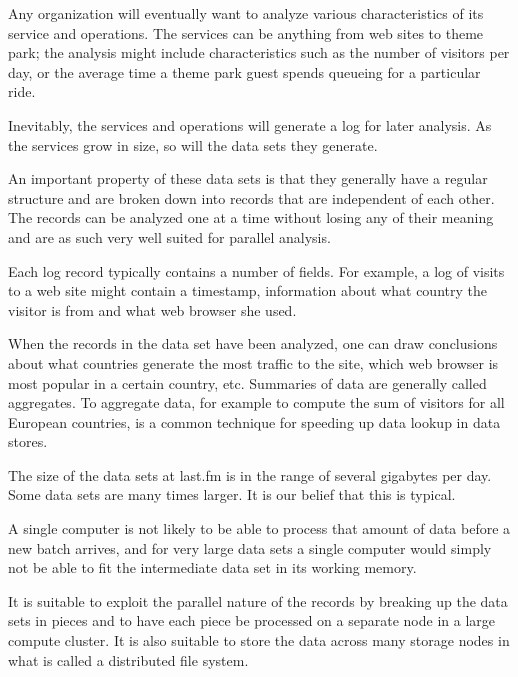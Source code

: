
Any organization will eventually want to analyze various characteristics of
its service and operations. The services can be anything from web sites to
theme park; the analysis might include characteristics such as the number of
visitors per day, or the average time a theme park guest spends queueing for a
particular ride.

Inevitably, the services and operations will generate a log for later
analysis. As the services grow in size, so will the data sets they generate.

An important property of these data sets is that they generally have a regular
structure and are broken down into records that are independent of each other.
The records can be analyzed one at a time without losing any of their meaning
and are as such very well suited for parallel analysis.

Each log record typically contains a number of fields. For example, a log of
visits to a web site might contain a timestamp, information about what country
the visitor is from and what web browser she used.

When the records in the data set have been analyzed, one can draw conclusions
about what countries generate the most traffic to the site, which web browser
is most popular in a certain country, etc. Summaries of data are generally
called aggregates. To aggregate data, for example to compute the sum of
visitors for all European countries, is a common technique for speeding up
data lookup in data stores.

The size of the data sets at last.fm is in the range of several gigabytes per
day. Some data sets are many times larger. It is our belief that this is
typical.

A single computer is not likely to be able to process that amount of data
before a new batch arrives, and for very large data sets a single computer
would simply not be able to fit the intermediate data set in its working
memory.

It is suitable to exploit the parallel nature of the records by breaking up
the data sets in pieces and to have each piece be processed on a separate
node in a large compute cluster. It is also suitable to store the data across
many storage nodes in what is called a distributed file system.




